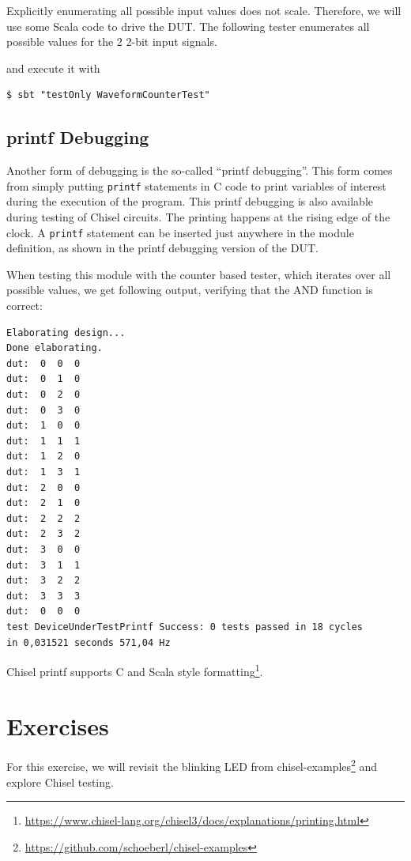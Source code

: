 \documentclass[%
    10pt,
    headinclude, footexclude,
    openright, %
    notitlepage,
    cleardoubleempty,
    headsepline,
    pointlessnumbers,
    bibtotoc, idxtotoc,
    ]{scrbook}
\newcommand{\code}[1]{{\small{\texttt{#1}}}}
\newcommand{\myref}[2]{\href{#1}{#2}}
\renewcommand{\myref}[2]{{#2}{\footnote{\url{#1}}}}
\begin{document}
Explicitly enumerating all possible input values does not scale. Therefore, we will use
some Scala code to drive the DUT. The following tester enumerates all possible values for
the 2 2-bit input signals.


\noindent and execute it with

\begin{verbatim}
$ sbt "testOnly WaveformCounterTest"
\end{verbatim}

\subsection{printf Debugging}

Another form of debugging is the so-called ``printf debugging''. This form comes from
simply putting \code{printf} statements in C code to print variables of interest during
the execution of the program. This printf debugging is also available during testing
of Chisel circuits. The printing happens at the rising edge of the clock.
A \code{printf} statement can be inserted just anywhere in the module definition,
as shown in the printf debugging version of the DUT.


\noindent When testing this module with the counter based tester, which iterates over all possible
values, we get following output, verifying that the AND function is correct:

\begin{verbatim}
Elaborating design...
Done elaborating.
dut:  0  0  0
dut:  0  1  0
dut:  0  2  0
dut:  0  3  0
dut:  1  0  0
dut:  1  1  1
dut:  1  2  0
dut:  1  3  1
dut:  2  0  0
dut:  2  1  0
dut:  2  2  2
dut:  2  3  2
dut:  3  0  0
dut:  3  1  1
dut:  3  2  2
dut:  3  3  3
dut:  0  0  0
test DeviceUnderTestPrintf Success: 0 tests passed in 18 cycles 
in 0,031521 seconds 571,04 Hz
\end{verbatim}

Chisel printf supports
\myref{https://www.chisel-lang.org/chisel3/docs/explanations/printing.html}{C and Scala style formatting}.


\section{Exercises}

For this exercise, we will revisit the blinking LED from
\myref{https://github.com/schoeberl/chisel-examples}{chisel-examples}
and explore Chisel testing.
\end{document}

